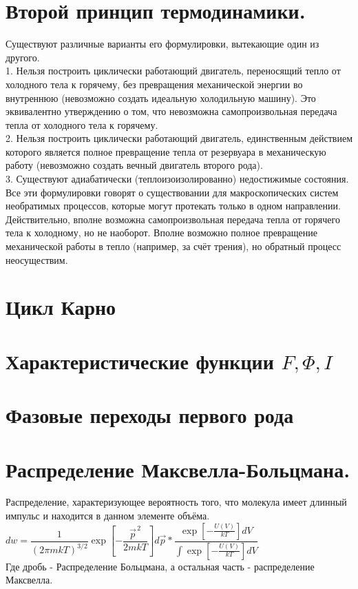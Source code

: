 \begin{multicols*}{2}
		\section{Второй принцип термодинамики.}
		Существуют различные варианты его формулировки, вытекающие один из другого.\\
		1. Нельзя построить циклически работающий двигатель, переносящий тепло от холодного тела к горячему, без превращения механической энергии во внутреннюю (невозможно создать идеальную холодильную машину). Это эквивалентно утверждению о том, что невозможна самопроизвольная передача тепла от холодного тела к горячему.\\
		2. Нельзя построить циклически работающий двигатель, единственным действием которого является полное превращение тепла от резервуара в механическую работу (невозможно создать вечный двигатель второго рода).\\
		3. Существуют адиабатически (теплоизоизолированно) недостижимые состояния.\\
		Все эти формулировки говорят о существовании для макроскопических систем необратимых процессов, которые могут протекать только в одном направлении. Действительно, вполне возможна самопроизвольная передача тепла от горячего тела к холодному, но не наоборот. Вполне возможно полное превращение механической работы в тепло (например, за счёт трения), но обратный процесс неосуществим.

		\section{Цикл Карно}

		\section{Характеристические функции $F, \Phi, I$}

		\section{Фазовые переходы первого рода}

		\section{Распределение Максвелла-Больцмана.}
		Распределение, характеризующее вероятность того, что молекула имеет длинный импульс и находится в данном элементе объёма.\\
		$dw=\dfrac 1 {(2\pi mkT)^{3/2}}\exp\left[-\dfrac{\vec {p}^{\,2}}{2mkT}\right]d\vec p * \dfrac{\exp\left[-\frac{U(V)}{kT}\right]dV}{\int\exp\left[-\frac{U(V)}{kT}\right]dV}$ \\
		Где дробь - Распределение Больцмана, а остальная часть - распределение Максвелла.


\end{multicols*}
